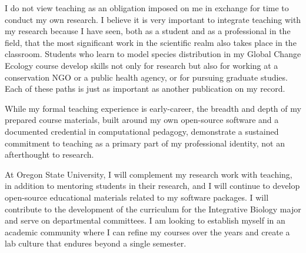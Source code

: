 \documentclass[11pt,letterpaper]{article}
\begin{document}
I do not view teaching as an obligation imposed on me in exchange for time to conduct my own research. I believe it is very important to integrate teaching with my research because I have seen, both as a student and as a professional in the field, that the most significant work in the scientific realm also takes place in the classroom. Students who learn to model species distribution in my Global Change Ecology course develop skills not only for research but also for working at a conservation NGO or a public health agency, or for pursuing graduate studies. Each of these paths is just as important as another publication on my record. 

While my formal teaching experience is early-career, the breadth and depth of my prepared course materials, built around my own open-source software and a documented credential in computational pedagogy, demonstrate a sustained commitment to teaching as a primary part of my professional identity, not an afterthought to research.

At Oregon State University, I will complement my research work with teaching, in addition to mentoring students in their research, and I will continue to develop open-source educational materials related to my software packages. I will contribute to the development of the curriculum for the Integrative Biology major and serve on departmental committees. I am looking to establish myself in an academic community where I can refine my courses over the years and create a lab culture that endures beyond a single semester.
\end{document}
